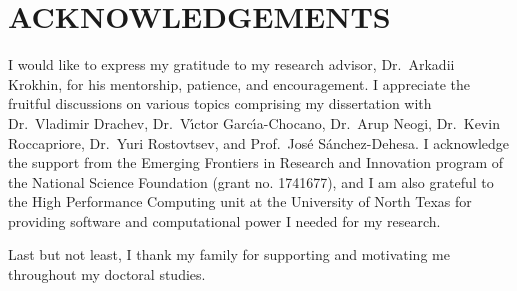 \chapter*{ACKNOWLEDGEMENTS}

I would like to express my gratitude to my research advisor, Dr.~Arkadii Krokhin, for his mentorship, patience, and encouragement.
I appreciate the fruitful discussions on various topics comprising my dissertation with Dr.~Vladimir Drachev, Dr.~V{\'\i}ctor Garc{\'\i}a-Chocano, Dr.~Arup Neogi, Dr.~Kevin Roccapriore, Dr.~Yuri Rostovtsev, and Prof.~Jos\'{e} S\'{a}nchez-Dehesa.
I acknowledge the support from the Emerging Frontiers in Research and Innovation program of the National Science Foundation (grant no. 1741677), and I am also grateful to the High Performance Computing unit at the University of North Texas for providing software and computational power I needed for my research.

Last but not least, I thank my family for supporting and motivating me throughout my doctoral studies.
